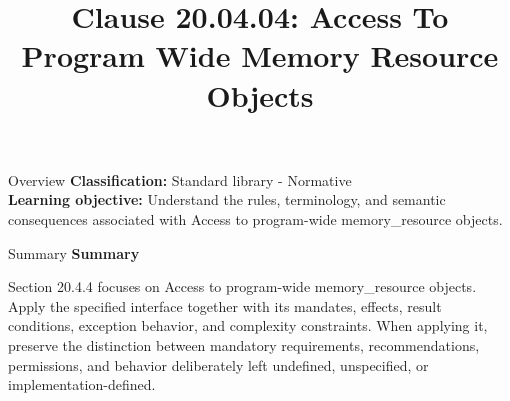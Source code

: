 \documentclass[10pt,letterpaper]{article}
\title{Clause 20.04.04: Access To Program Wide Memory Resource Objects}
\author{}
\date{}
\begin{document}
\maketitle
\begin{CornellOverviewBox}{Overview}
\textbf{Classification:} Standard library - Normative\\[2pt]
\textbf{Learning objective:} Understand the rules, terminology, and semantic consequences associated with Access to program-wide memory\_resource objects.
\end{CornellOverviewBox}\begin{CornellSummaryBox}{Summary}
{\sffamily\bfseries\color{Accent} Summary}\par\vspace{3pt}Section 20.4.4 focuses on Access to program-wide memory\_resource objects. Apply the specified interface together with its mandates, effects, result conditions, exception behavior, and complexity constraints. When applying it, preserve the distinction between mandatory requirements, recommendations, permissions, and behavior deliberately left undefined, unspecified, or implementation-defined.
\end{CornellSummaryBox}
\end{document}
